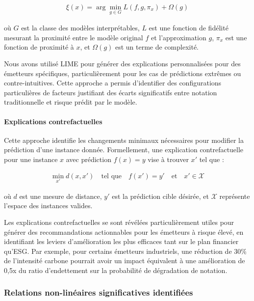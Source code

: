\begin{align}
\xi(x) = \arg\min_{g \in G} L(f, g, \pi_x) + \Omega(g)
\end{align}

où $G$ est la classe des modèles interprétables, $L$ est une fonction de fidélité mesurant la proximité entre le modèle original $f$ et l'approximation $g$, $\pi_x$ est une fonction de proximité à $x$, et $\Omega(g)$ est un terme de complexité.

Nous avons utilisé LIME pour générer des explications personnalisées pour des émetteurs spécifiques, particulièrement pour les cas de prédictions extrêmes ou contre-intuitives. Cette approche a permis d'identifier des configurations particulières de facteurs justifiant des écarts significatifs entre notation traditionnelle et risque prédit par le modèle.

\paragraph{Explications contrefactuelles} 

Cette approche identifie les changements minimaux nécessaires pour modifier la prédiction d'une instance donnée. Formellement, une explication contrefactuelle pour une instance $x$ avec prédiction $f(x) = y$ vise à trouver $x'$ tel que :

\begin{align}
\min_{x'} d(x, x') \quad \text{tel que} \quad f(x') = y' \quad \text{et} \quad x' \in \mathcal{X}
\end{align}

où $d$ est une mesure de distance, $y'$ est la prédiction cible désirée, et $\mathcal{X}$ représente l'espace des instances valides.

Les explications contrefactuelles se sont révélées particulièrement utiles pour générer des recommandations actionnables pour les émetteurs à risque élevé, en identifiant les leviers d'amélioration les plus efficaces tant sur le plan financier qu'ESG. Par exemple, pour certains émetteurs industriels, une réduction de 30\% de l'intensité carbone pourrait avoir un impact équivalent à une amélioration de 0,5x du ratio d'endettement sur la probabilité de dégradation de notation.

\subsubsection{Relations non-linéaires significatives identifiées}

